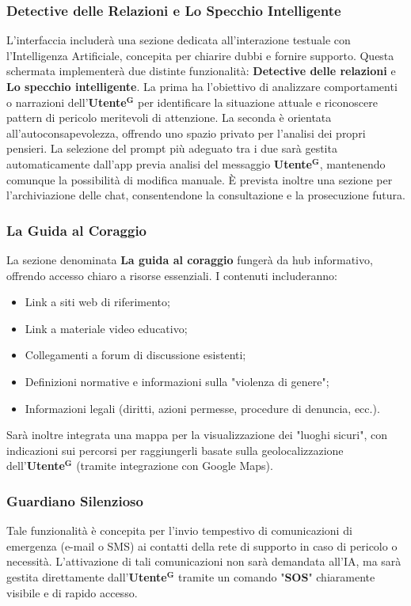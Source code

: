 \documentclass[a4paper,12pt]{article}
\newcommand{\term}[1]{\textbf{#1}$^\mathbf{G}$}
\begin{document}
\subsubsection{Detective delle Relazioni e Lo Specchio Intelligente}
L'interfaccia includerà una sezione dedicata all'interazione testuale con l'Intelligenza Artificiale, concepita per chiarire dubbi e fornire supporto. Questa schermata implementerà due distinte funzionalità: \textbf{Detective delle relazioni} e \textbf{Lo specchio intelligente}.
La prima ha l'obiettivo di analizzare comportamenti o narrazioni dell'\term{Utente} per identificare la situazione attuale e riconoscere pattern di pericolo meritevoli di attenzione. La seconda è orientata all'autoconsapevolezza, offrendo uno spazio privato per l'analisi dei propri pensieri.
La selezione del prompt più adeguato tra i due sarà gestita automaticamente dall'app previa analisi del messaggio \term{Utente}, mantenendo comunque la possibilità di modifica manuale. È prevista inoltre una sezione per l'archiviazione delle chat, consentendone la consultazione e la prosecuzione futura.

\subsubsection{La Guida al Coraggio}
La sezione denominata \textbf{La guida al coraggio} fungerà da hub informativo, offrendo accesso chiaro a risorse essenziali. I contenuti includeranno:
\begin{itemize}
    \item Link a siti web di riferimento;
    \item Link a materiale video educativo;
    \item Collegamenti a forum di discussione esistenti;
    \item Definizioni normative e informazioni sulla "violenza di genere";
    \item Informazioni legali (diritti, azioni permesse, procedure di denuncia, ecc.).
\end{itemize}
Sarà inoltre integrata una mappa per la visualizzazione dei "luoghi sicuri", con indicazioni sui percorsi per raggiungerli basate sulla geolocalizzazione dell'\term{Utente} (tramite integrazione con Google Maps).

\subsubsection{Guardiano Silenzioso}
Tale funzionalità è concepita per l'invio tempestivo di comunicazioni di emergenza (e-mail o SMS) ai contatti della rete di supporto in caso di pericolo o necessità. L'attivazione di tali comunicazioni non sarà demandata all'IA, ma sarà gestita direttamente dall'\term{Utente} tramite un comando "\textbf{SOS}" chiaramente visibile e di rapido accesso.
\end{document}
